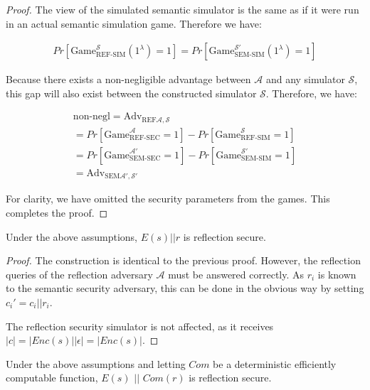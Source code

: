 \begin{proof}
    The view of the simulated semantic simulator is the same as if it were run
    in an actual semantic simulation game. Therefore we have:

    \begin{align*}
        Pr[\text{Game}_{\text{REF-SIM}}^{\mathcal{S}}(1^{\lambda})
        = 1]
        =
        Pr[\text{Game}_{\text{SEM-SIM}}^{\mathcal{S'}}(1^{\lambda})
        = 1]
    \end{align*}

    Because there exists a non-negligible advantage between $\mathcal{A}$ and
    any simulator $\mathcal{S}$, this gap will also exist between the
    constructed simulator $\mathcal{S}$. Therefore, we have:

    \begin{align*}
        \text{non-negl} = \text{Adv}_{\text{REF} \mathcal{A}, \mathcal{S}}\\
        =
        Pr[\text{Game}_{\text{REF-SEC}}^{\mathcal{A}}
        = 1] -
        Pr[\text{Game}_{\text{REF-SIM}}^{\mathcal{S}}
        = 1]\\
        =
        Pr[\text{Game}_{\text{SEM-SEC}}^{\mathcal{A'}}
        = 1]
        -
        Pr[\text{Game}_{\text{SEM-SIM}}^{\mathcal{S'}}
        = 1]\\
        =
        \text{Adv}_{\text{SEM} \mathcal{A'}, \mathcal{S'}}
    \end{align*}

    For clarity, we have omitted the security parameters from the games.
    This completes the proof.
\end{proof}

\begin{lemma}
    Under the above assumptions, $E(s) || r$ is reflection secure.
\end{lemma}

\begin{proof}
    The construction is identical to the previous proof. However, the
    reflection queries of the reflection adversary $\mathcal{A}$ must be
    answered correctly. As $r_i$ is known to the semantic security adversary,
    this can be done in the obvious way by setting $c_i' = c_i || r_i$.

    The reflection security simulator is not affected, as it receives $|c| =
    |Enc(s) || \epsilon| = |Enc(s)|$.
\end{proof}

\begin{lemma}
    Under the above assumptions and letting $Com$ be a deterministic
    efficiently computable function, $E(s)$ $||$ $Com(r)$ is reflection secure.
\end{lemma}

